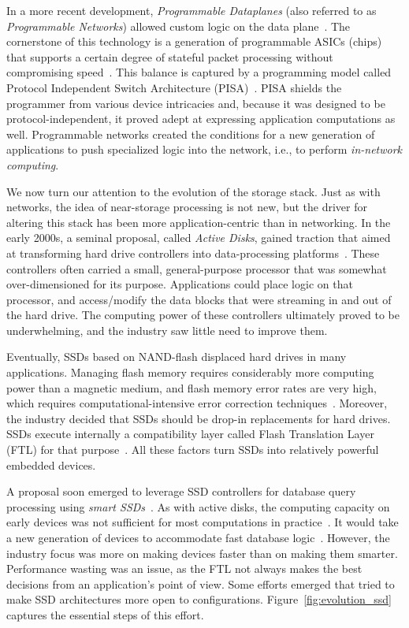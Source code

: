 \documentclass[11pt,dvipdfmx]{article}
\begin{document}
In a more recent development, \emph{Programmable Dataplanes} (also referred to
as \emph{Programmable Networks}) allowed custom logic on the data
plane~\cite{bifulco18}.
The cornerstone of this technology is a generation of programmable ASICs (chips)
that supports a certain degree of stateful packet processing without compromising
speed~\cite{bosshart13}.
This balance is captured by a programming model called Protocol Independent
Switch Architecture (PISA)~\cite{sivaraman16}.
PISA shields the programmer from various device intricacies and, because it was
designed to be protocol-independent, it proved adept at expressing application
computations as well.
Programmable networks created the conditions for a new generation of
applications to push specialized logic into the network, i.e., to perform
\emph{in-network computing}.


\vspace{1em}
We now turn our attention to the evolution of the storage stack.
Just as with networks, the idea of near-storage processing is not new, but the
driver for altering this stack has been more application-centric than in
networking.
In the early 2000s, a seminal proposal, called \emph{Active Disks}, gained
traction that aimed at transforming hard drive controllers into data-processing
platforms~\cite{riedel01}.
These controllers often carried a small, general-purpose processor that was
somewhat over-dimensioned for its purpose.
Applications could place logic on that processor, and access/modify the data
blocks that were streaming in and out of the hard drive.
The computing power of these controllers ultimately proved to be underwhelming,
and the industry saw little need to improve them.


Eventually, SSDs based on NAND-flash displaced hard drives in many applications.
Managing flash memory requires considerably more computing power than a magnetic
medium, and flash memory error rates are very high, which requires
computational-intensive error correction techniques~\cite{cai17}.
Moreover, the industry decided that SSDs should be drop-in replacements for hard
drives.
SSDs execute internally a compatibility layer called Flash Translation Layer
(FTL) for that purpose~\cite{chung09}.
All these factors turn SSDs into relatively powerful embedded devices.


A proposal soon emerged to leverage SSD controllers for database query
processing using \emph{smart SSDs}~\cite{do13}.
As with active disks, the computing capacity on early devices was not sufficient
for most computations in practice~\cite{do19}.
It would take a new generation of devices to accommodate fast database
logic~\cite{kim16}.
However, the industry focus was more on making devices faster than on making
them smarter.
Performance wasting was an issue, as the FTL not always makes the best decisions
from an application's point of view.
Some efforts emerged that tried to make SSD architectures more open to
configurations.
Figure~\ref{fig:evolution_ssd} captures the essential steps of this effort.
\end{document}

